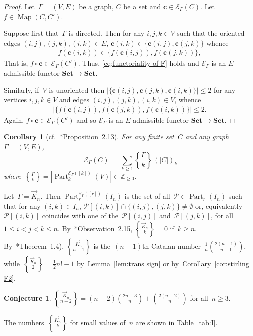 \documentclass[12pt, reqno]{amsart}
\newcommand{\stirling}[2]{\genfrac{\{}{\}}{0pt}0{#1}{#2}}
\newcommand{\tstirling}[2]{\genfrac{\{}{\}}{0pt}1{#1}{#2}}
\newtheorem{corollary}[theorem]{Corollary}
\theoremstyle{definition}
\newtheorem{conjecture}[theorem]{Conjecture}
\numberwithin{equation}{section}
\newcommand{\ZZ}{{\mathbb Z}}
\DeclareMathOperator{\Map}{Map}
\DeclareMathOperator{\Part}{Part}
\newcommand{\EE}{{\mathcal{E}}}
\begin{document}
\begin{proof} 
Let~$\Gamma=(V,E)$ be a graph, $C$ be a set and $\mathbf c\in \EE_{\Gamma}(C)$. Let~$f\in\Map(C,C')$.

Suppose first that~$\Gamma$ is directed. Then for any $i,j,k\in V$
such that the oriented edges $(i,j),(j,k),(i,k)\in E$, 
$\mathbf c(i,k)\in \{\mathbf c(i,j),\mathbf c(j,k)\}$ whence 
\begin{align*}
f(\mathbf c(i,k)) \in \{ f(\mathbf c(i,j)), f(\mathbf c(j,k)) \},
\end{align*}
That is, $f\circ \mathbf c \in \EE_{\Gamma}(C')$. Thus, \eqref{eq:functoriality of F} holds and $\EE_{\Gamma}$ is an $E$-admissible functor $\mathbf{Set}\to \mathbf{Set}$.

Similarly, if~$V$ is unoriented then $|\{\mathbf c(i,j),
\mathbf c(j,k),\mathbf c(i,k)\}|\le 2$
for any vertices $i,j,k\in V$
and edges $(i,j),(j,k),(i,k)\in V$, whence 
\begin{align*}
|\{ f(\mathbf c(i,j)), f(\mathbf c(j,k)), f(\mathbf c(i,k)) \}| \le 2.
\end{align*}
Again, $f\circ \mathbf c \in \EE_{\Gamma}(C')$ and so $\EE_{\Gamma}$ is an $E$-admissible functor $\mathbf{Set}\to \mathbf{Set}$.
\end{proof}
\begin{corollary}[cf.~\cite{ABGJepr}*{Proposition~2.13}]\label{cor:enum transitive}
For any finite set~$C$ and any graph~$\Gamma=(V,E)$,
$$
|\mathcal E_\Gamma(C)|=\sum_{k\ge 1}\stirling{\Gamma}{k}\, (|C|)_k
$$
where~$\tstirling{\Gamma}{k}=|\Part_k^{\mathcal E_{\Gamma}([k])}(V)|\in\ZZ_{\ge 0}$.
\end{corollary}
Let~$\Gamma=\vec K_n$. Then
$\Part^{\EE_{\Gamma}([r])}_r(I_n)$
is the set of all~$\mathcal P\in\Part_r(I_n)$
such that for any $(i,k)\in I_n$,
$\mathcal P[(i,k)]\cap \{ (i,j),(j,k)\}\not=\emptyset$ or, equivalently $\mathcal P[(i,k)]$ coincides
with one of the~$\mathcal P[(i,j)]$ and~$\mathcal P[(j,k)]$, 
for all~$1\le i<j<k\le n$. By~\cite{ABGJ}*{Observation~2.15}, $\tstirling{\vec K_n}{k}=0$
if~$k\ge n$. By~\cite{ABGJ}*{Theorem~1.4}), $\tstirling{\vec K_{n}}{n-1}$ is the~$(n-1)$th 
Catalan number~$\frac{1}{n}\binom{2(n-1)}{n-1}$, while~$\tstirling{\vec K_n}{2}=\frac12n!-1$ by~Lemma~\ref{lem:trans sign} or by~Corollary~\ref{cor:stirling F2}. 
\begin{conjecture}\label{conj:K n n-2}
$\tstirling{\vec K_n}{n-2}=(n-2)\binom{2n-3}n+\binom{2(n-2)}n$
for all~$n\ge 3$.
\end{conjecture}
The numbers~$\tstirling{\vec K_n}{k}$ for small values of~$n$ are shown in Table~\ref{tab:I}.
\end{document}

